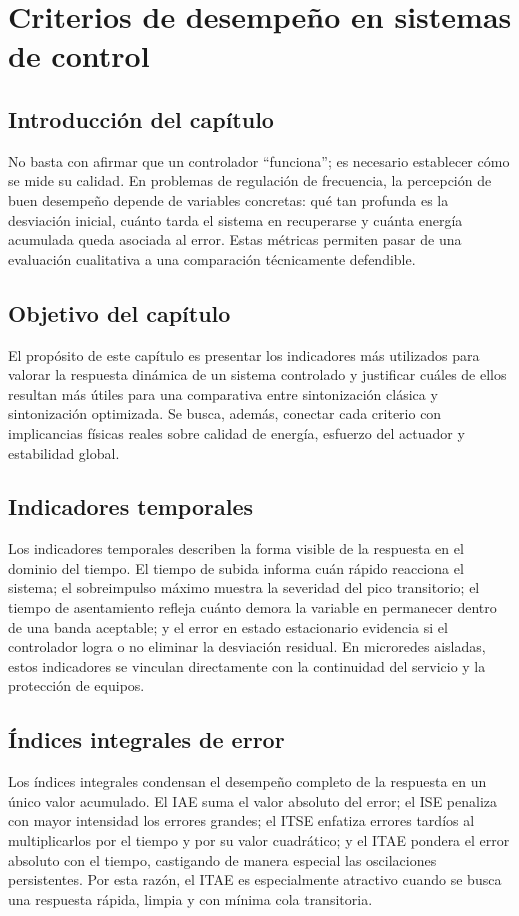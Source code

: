 \chapter{Criterios de desempeño en sistemas de control}
\label{ch:criterios-desempeno}

\section{Introducción del capítulo}
No basta con afirmar que un controlador ``funciona''; es necesario establecer cómo se mide su
calidad. En problemas de regulación de frecuencia, la percepción de buen desempeño depende
de variables concretas: qué tan profunda es la desviación inicial, cuánto tarda el sistema en
recuperarse y cuánta energía acumulada queda asociada al error. Estas métricas permiten pasar
de una evaluación cualitativa a una comparación técnicamente defendible.

\section{Objetivo del capítulo}
El propósito de este capítulo es presentar los indicadores más utilizados para valorar la
respuesta dinámica de un sistema controlado y justificar cuáles de ellos resultan más útiles
para una comparativa entre sintonización clásica y sintonización optimizada. Se busca, además,
conectar cada criterio con implicancias físicas reales sobre calidad de energía, esfuerzo del
actuador y estabilidad global.

\section{Indicadores temporales}
Los indicadores temporales describen la forma visible de la respuesta en el dominio del tiempo.
El tiempo de subida informa cuán rápido reacciona el sistema; el sobreimpulso máximo muestra
la severidad del pico transitorio; el tiempo de asentamiento refleja cuánto demora la variable en
permanecer dentro de una banda aceptable; y el error en estado estacionario evidencia si el
controlador logra o no eliminar la desviación residual. En microredes aisladas, estos
indicadores se vinculan directamente con la continuidad del servicio y la protección de equipos.

\section{Índices integrales de error}
Los índices integrales condensan el desempeño completo de la respuesta en un único valor
acumulado. El IAE suma el valor absoluto del error; el ISE penaliza con mayor intensidad los
errores grandes; el ITSE enfatiza errores tardíos al multiplicarlos por el tiempo y por su valor
cuadrático; y el ITAE pondera el error absoluto con el tiempo, castigando de manera especial
las oscilaciones persistentes. Por esta razón, el ITAE es especialmente atractivo cuando se
busca una respuesta rápida, limpia y con mínima cola transitoria.

